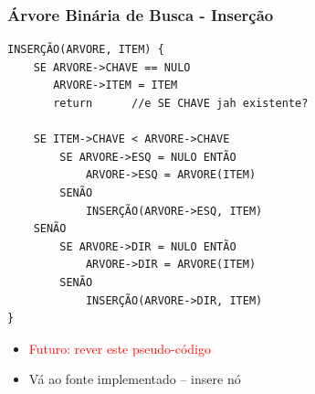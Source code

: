 
\begin{frame}[fragile]
\frametitle{Árvore Binária de Busca - Inserção}
\begin{verbatim}
INSERÇÃO(ARVORE, ITEM) {
    SE ARVORE->CHAVE == NULO
       ARVORE->ITEM = ITEM
       return      //e SE CHAVE jah existente?

    SE ITEM->CHAVE < ARVORE->CHAVE
        SE ARVORE->ESQ = NULO ENTÃO
            ARVORE->ESQ = ARVORE(ITEM)
        SENÃO
            INSERÇÃO(ARVORE->ESQ, ITEM)
    SENÃO
        SE ARVORE->DIR = NULO ENTÃO
            ARVORE->DIR = ARVORE(ITEM)
        SENÃO
            INSERÇÃO(ARVORE->DIR, ITEM)
}
\end{verbatim}
\begin{itemize}
  \item 
 \textcolor{red}{Futuro: rever este pseudo-código}
  \item Vá ao fonte implementado -- insere nó

\end{itemize}

\end{frame}


